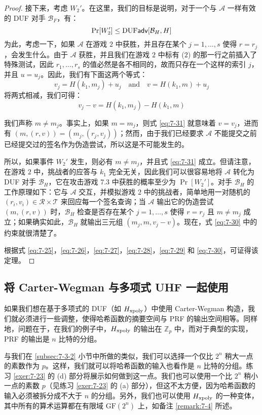 \begin{proof}
接下来，考虑 $W_2'$。在这里，我们的目标是说明，对于一个与 $\mathcal{A}$ 一样有效的 DUF 对手 $\mathcal{B}_F$，有：
\begin{equation}\label{eq:7-30}
\Pr[W_2']\leq{\rm DUF}\mathsf{adv}[\mathcal{B}_H,H]
\end{equation}
为此，考虑一下，如果 $\mathcal{A}$ 在游戏 $2$ 中获胜，并且存在某个 $j=1,\dots,s$ 使得 $r=r_j$，会发生什么。由于 $\mathcal{A}$ 获胜，并且我们在游戏 $2$ 中标有 ($2$) 的那一行之前插入了特殊测试，因此 $r_1,\dots,r_s$ 的值必然是各不相同的，故而只存在一个这样的索引 $j$，并且 $u=u_j$。因此，我们有下面这两个等式：
\[
v_j=H(k_1,m_j)+u_j
\quad\text{and}\quad
v=H(k_1,m)+u_j
\]
将两式相减，我们可得：
\begin{equation}\label{eq:7-31}
v_j-v=H(k_1,m_j)-H(k_1,m)
\end{equation}

我们声称 $m\neq m_j$。事实上，如果 $m=m_j$，则式 \ref{eq:7-31} 就意味着 $v=v_j$，进而有 $(m,(r,v))=(m_j,(r_j,v_j))$；然而，由于我们已经要求 $\mathcal{A}$ 不能提交之前已经提交过的签名作为伪造尝试，所以这是不可能发生的。

所以，如果事件 $W_2'$ 发生，则必有 $m\neq m_j$，并且式 \ref{eq:7-31} 成立。但请注意，在游戏 $2$ 中，挑战者的应答与 $k_1$ 完全无关，因此我们可以很容易地将 $\mathcal{A}$ 转化为 DUF 对手 $\mathcal{B}_H$，它在攻击游戏 7.3 中获胜的概率至少为 $\Pr[W_2']$。对手 $\mathcal{B}_H$ 的工作原理如下：它与 $\mathcal{A}$ 交互，并模拟游戏 $2$ 中的挑战者，简单地用一对随机的 $(r_i,v_i)\in\mathcal{R}\times\mathcal{T}$ 来回应每一个签名查询；当 $\mathcal{A}$ 输出它的伪造尝试 $(m,(r,v))$ 时，$\mathcal{B}_H$ 检查是否存在某个 $j=1,\dots,s$ 使得 $r=r_j$ 且 $m\neq m_j$ 成立；如果确实如此，$\mathcal{B}_H$ 就输出三元组 $(m_j,m,v_j-v)$。现在，式 \ref{eq:7-30} 中的约束就很清楚了。

根据式 \ref{eq:7-25}，\ref{eq:7-26}，\ref{eq:7-27}，\ref{eq:7-28}，\ref{eq:7-29} 和 \ref{eq:7-30}，可证得该定理。
\end{proof}

\subsection{将 Carter-Wegman 与多项式 UHF 一起使用}\label{subsec:7-4-1}

如果我们想在基于多项式的 DUF（如 $H_{\rm xpoly}$）中使用 Carter-Wegman 构造，我们就必须进行一些调整，使得哈希函数的摘要空间与 PRF 的输出空间相等。同样地，问题在于，在我们的例子中，$H_{\rm xpoly}$ 的输出在 $\mathbb{Z}_p$ 中，而对于典型的实现，PRF 的输出是 $n$ 比特的分组。

与我们在 \ref{subsec:7-3-2} 小节中所做的类似，我们可以选择一个仅比 $2^n$ 稍大一点的素数作为 $p$。这样，我们就可以将哈希函数的输入也看作是 $n$ 比特的分组。练习 \ref{exer:7-23} 的 (d) 部分将展示如何做到这一点。我们也可以使用一个比 $2^n$ 稍小一点的素数 $p$（见练习 \ref{exer:7-23} 的 (a) 部分），但这不太方便，因为哈希函数的输入必须被拆分成不大于 $n$ 的分组。另外，我们也可以使用 $H_{\rm xpoly}$ 的一种变体，其中所有的算术运算都在有限域 $\mathrm{GF}(2^n)$ 上，如备注 \ref{remark:7-4} 所述。